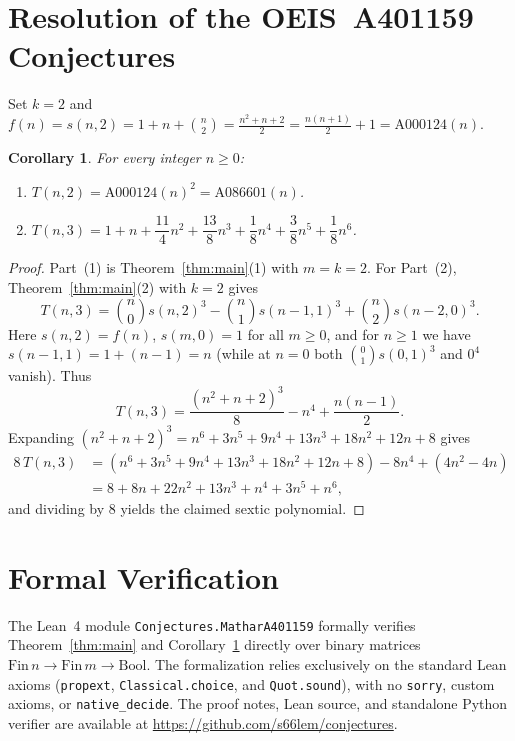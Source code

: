 \documentclass[11pt]{article}
\newtheorem{corollary}[theorem]{Corollary}
\begin{document}
\section{Resolution of the OEIS~A401159 Conjectures}

Set $k = 2$ and $f(n) = s(n, 2) = 1 + n + \binom{n}{2} = \frac{n^2 + n + 2}{2} = \frac{n(n + 1)}{2} + 1 = \mathrm{A000124}(n)$.

\begin{corollary}\label{cor:a401159}
For every integer $n \ge 0$:
\begin{enumerate}
  \item $T(n, 2) = \mathrm{A000124}(n)^2 = \mathrm{A086601}(n)$.
  \item $T(n, 3) = 1 + n + \dfrac{11}{4}n^2 + \dfrac{13}{8}n^3 + \dfrac{1}{8}n^4 + \dfrac{3}{8}n^5 + \dfrac{1}{8}n^6$.
\end{enumerate}
\end{corollary}

\begin{proof}
Part~(1) is Theorem~\ref{thm:main}(1) with $m = k = 2$. For Part~(2), Theorem~\ref{thm:main}(2) with $k = 2$ gives
\[
  T(n, 3) = \binom{n}{0} s(n, 2)^3 - \binom{n}{1} s(n - 1, 1)^3 + \binom{n}{2} s(n - 2, 0)^3.
\]
Here $s(n, 2) = f(n)$, $s(m, 0) = 1$ for all $m \ge 0$, and for $n \ge 1$ we have $s(n - 1, 1) = 1 + (n - 1) = n$ (while at $n = 0$ both $\binom{0}{1} s(0, 1)^3$ and $0^4$ vanish). Thus
\[
  T(n, 3) = \frac{(n^2 + n + 2)^3}{8} - n^4 + \frac{n(n - 1)}{2}.
\]
Expanding $(n^2 + n + 2)^3 = n^6 + 3n^5 + 9n^4 + 13n^3 + 18n^2 + 12n + 8$ gives
\begin{align*}
  8\,T(n, 3) &= (n^6 + 3n^5 + 9n^4 + 13n^3 + 18n^2 + 12n + 8) - 8n^4 + (4n^2 - 4n) \\
  &= 8 + 8n + 22n^2 + 13n^3 + n^4 + 3n^5 + n^6,
\end{align*}
and dividing by $8$ yields the claimed sextic polynomial.
\end{proof}

\section{Formal Verification}

The Lean~4 module \texttt{Conjectures.MatharA401159} formally verifies Theorem~\ref{thm:main} and Corollary~\ref{cor:a401159} directly over binary matrices $\mathrm{Fin}\,n \to \mathrm{Fin}\,m \to \mathrm{Bool}$. The formalization relies exclusively on the standard Lean axioms (\texttt{propext}, \texttt{Classical.choice}, and \texttt{Quot.sound}), with no \texttt{sorry}, custom axioms, or \texttt{native\_decide}. The proof notes, Lean source, and standalone Python verifier are available at \url{https://github.com/s66lem/conjectures}.
\end{document}
